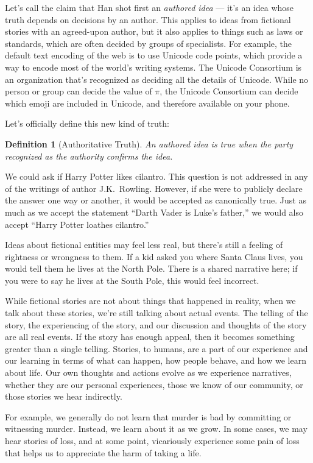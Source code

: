 \documentclass[11pt, oneside]{article}
\newtheorem*{defn}{Definition}
\begin{document}
Let's call the claim that Han shot first
an {\em authored idea} --- it's an idea whose
truth depends on decisions by an author.
This applies to ideas from fictional stories with an agreed-upon
author, but it also applies to things such as laws or standards, which are often
decided by groups of specialists. For example, the default text encoding of the
web is to use Unicode code points, which provide a way to encode most of the
world's writing systems. The Unicode Consortium is an organization that's
recognized as deciding all the details of Unicode.
While no person or group can decide the value of $\pi$, the Unicode Consortium
can decide which emoji are included in Unicode, and therefore available on your
phone.

Let's officially define this new kind of truth:
\begin{defn}[Authoritative Truth]
    An authored idea is true when the party recognized as the authority confirms
    the idea.
\end{defn}

We could ask if Harry Potter likes cilantro. This question is not addressed in
any of the writings of author J.K.~Rowling. However, if she were to publicly
declare the answer one way or another, it would be accepted as canonically true.
Just as much as we accept the statement ``Darth Vader is Luke's father,'' we
would also accept ``Harry Potter loathes cilantro.''

Ideas about fictional entities may feel less real,
but there's still a feeling of rightness or wrongness to them.
If a kid asked you where Santa Claus lives, you would tell them he
lives at the North Pole. There is a shared narrative here; if you were to say he
lives at the South Pole, this would feel incorrect.

While fictional stories are not about things that happened in reality, when we
talk about these stories, we're still talking about actual events. The telling
of the story,
the experiencing of the story, and our discussion and thoughts of the
story are all real events.
If the story has enough appeal,
then it becomes something greater than a single telling.
Stories,
to humans, are a part of our experience and our learning in terms of what can
happen, how people behave, and how we learn about life. Our own thoughts and
actions evolve as we experience narratives, whether they are our personal
experiences, those we know of our community, or those stories we hear
indirectly.

For example, we generally do not learn that murder is bad by committing or
witnessing murder. Instead, we learn about it as we grow. In some cases, we may
hear stories of loss, and at some point, vicariously experience some pain of
loss that helps us to appreciate the harm of taking a life.
\end{document}
